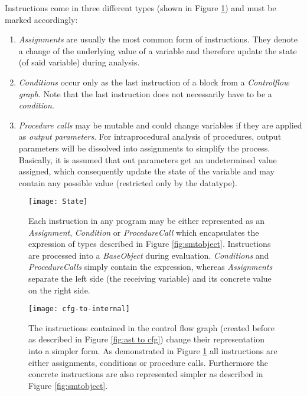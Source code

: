 Instructions come in three different types (shown in Figure \ref{fig:state}) and must be marked accordingly:
\begin{enumerate}
	\item \emph{Assignments} are usually the most common form of instructions. They denote a change of the underlying value of a variable and therefore update the state (of said variable) during analysis. 
	\item \emph{Conditions} occur only as the last instruction of a block from a \emph{Controlflow graph}. Note that the last instruction does not necessarily have to be a \emph{condition}.
	\item \emph{Procedure calls} may be mutable and could change variables if they are applied as \emph{output parameters}. %
	For intraprocedural analysis of procedures, output parameters will be dissolved into assignments to simplify the process. Basically, it is assumed that out parameters get an undetermined value assigned, which consequently update the state of the variable and may contain any possible value (restricted only by the datatype).
\end{enumerate}
\begin{figure}
	\centering
	\texttt{[image: State]}
	\caption{Each instruction in any program may be either represented as an \emph{Assignment}, \emph{Condition} or \emph{ProcedureCall} which encapsulates the expression of types described in Figure \ref{fig:smtobject}. Instructions are processed into a \emph{BaseObject} during evaluation. \emph{Conditions} and \emph{ProcedureCalls} simply contain the expression, whereas \emph{Assignments} separate the left side (the receiving variable) and its concrete value on the right side.}
	\label{fig:state}
\end{figure}
\begin{figure}
	\centering
	\texttt{[image: cfg-to-internal]}
	\caption{The instructions contained in the control flow graph (created before as described in Figure \ref{fig:ast to cfg}) change their representation into a simpler form. As demonstrated in Figure \ref{fig:state} all instructions are either assignments, conditions or procedure calls. Furthermore the concrete instructions are also represented simpler as described in Figure \ref{fig:smtobject}. }
	\label{fig:cfg to internal}
\end{figure}

